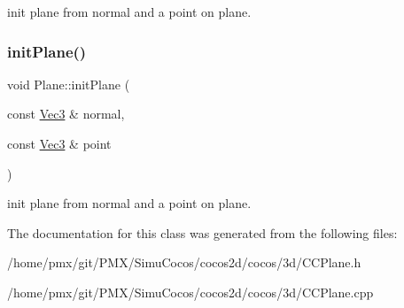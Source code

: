init plane from normal and a point on plane. \mbox{\label{classPlane_a648afe6850294d33355f7c4625fffe4f}} 
\subsubsection{\texorpdfstring{init\+Plane()}{initPlane()}\hspace{0.1cm}{\footnotesize\ttfamily [6/6]}}
{\footnotesize\ttfamily void Plane\+::init\+Plane (\begin{DoxyParamCaption}\item[{const \hyperlink{classVec3}{Vec3} \&}]{normal,  }\item[{const \hyperlink{classVec3}{Vec3} \&}]{point }\end{DoxyParamCaption})}

init plane from normal and a point on plane. 

The documentation for this class was generated from the following files\+:\begin{DoxyCompactItemize}
\item 
/home/pmx/git/\+P\+M\+X/\+Simu\+Cocos/cocos2d/cocos/3d/C\+C\+Plane.\+h\item 
/home/pmx/git/\+P\+M\+X/\+Simu\+Cocos/cocos2d/cocos/3d/C\+C\+Plane.\+cpp\end{DoxyCompactItemize}
